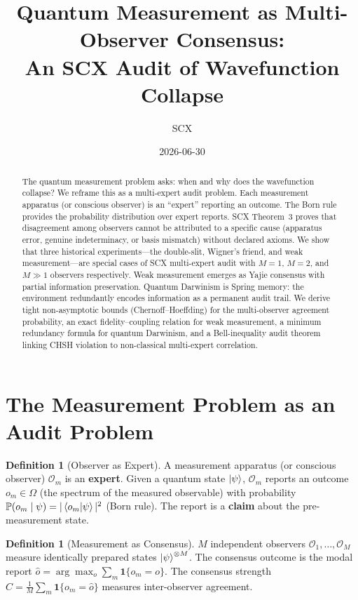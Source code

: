 \documentclass[11pt,a4paper]{article}
\title{\bfseries Quantum Measurement as Multi-Observer Consensus: \\
An SCX Audit of Wavefunction Collapse}
\author{SCX}
\date{2026-06-30}
\theoremstyle{definition}
\newtheorem{definition}[theorem]{Definition}
\theoremstyle{remark}
\newcommand{\Pbb}{\mathbb{P}}
\newcommand{\Obs}{\mathcal{O}}
\begin{document}
\maketitle

\begin{abstract}
The quantum measurement problem asks: when and why does the wavefunction collapse? We reframe this as a multi-expert audit problem. Each measurement apparatus (or conscious observer) is an ``expert'' reporting an outcome. The Born rule provides the probability distribution over expert reports. SCX Theorem~3 proves that disagreement among observers cannot be attributed to a specific cause (apparatus error, genuine indeterminacy, or basis mismatch) without declared axioms. We show that three historical experiments---the double-slit, Wigner's friend, and weak measurement---are special cases of SCX multi-expert audit with $M=1$, $M=2$, and $M \gg 1$ observers respectively. Weak measurement emerges as Yajie consensus with partial information preservation. Quantum Darwinism is Spring memory: the environment redundantly encodes information as a permanent audit trail. We derive tight non-asymptotic bounds (Chernoff--Hoeffding) for the multi-observer agreement probability, an exact fidelity--coupling relation for weak measurement, a minimum redundancy formula for quantum Darwinism, and a Bell-inequality audit theorem linking CHSH violation to non-classical multi-expert correlation.
\end{abstract}

\section{The Measurement Problem as an Audit Problem}

\begin{definition}[Observer as Expert]
A measurement apparatus (or conscious observer) $\Obs_m$ is an \textbf{expert}. Given a quantum state $\ket{\psi}$, $\Obs_m$ reports an outcome $o_m \in \Omega$ (the spectrum of the measured observable) with probability $\Pbb(o_m \mid \psi) = |\braket{o_m|\psi}|^2$ (Born rule). The report is a \textbf{claim} about the pre-measurement state.
\end{definition}

\begin{definition}[Measurement as Consensus]
$M$ independent observers $\Obs_1,\ldots,\Obs_M$ measure identically prepared states $\ket{\psi}^{\otimes M}$. The consensus outcome is the modal report $\hat{o} = \arg\max_o \sum_m \mathbf{1}\{o_m = o\}$. The consensus strength $C = \frac{1}{M}\sum_m \mathbf{1}\{o_m = \hat{o}\}$ measures inter-observer agreement.
\end{definition}
\end{document}
